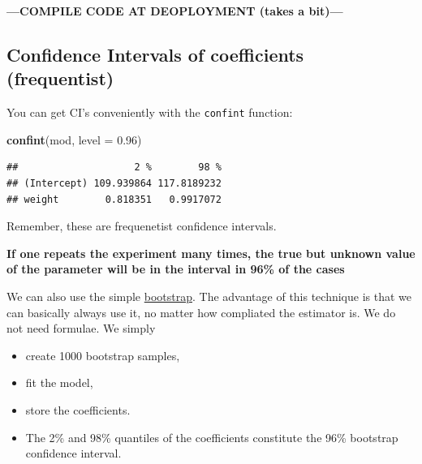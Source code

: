 \documentclass[
]{book}
\newenvironment{Shaded}{\begin{snugshade}}{\end{snugshade}}
\newcommand{\AttributeTok}[1]{\textcolor[rgb]{0.13,0.29,0.53}{#1}}
\newcommand{\FloatTok}[1]{\textcolor[rgb]{0.00,0.00,0.81}{#1}}
\newcommand{\FunctionTok}[1]{\textcolor[rgb]{0.13,0.29,0.53}{\textbf{#1}}}
\newcommand{\NormalTok}[1]{#1}
\providecommand{\tightlist}{%
  \setlength{\itemsep}{0pt}\setlength{\parskip}{0pt}}
\begin{document}
\textbf{---COMPILE CODE AT DEOPLOYMENT (takes a bit)---}

\subsection{Confidence Intervals of coefficients (frequentist)}\label{confidence_intervals_frequentist}

You can get CI's conveniently with the \texttt{confint} function:

\begin{Shaded}
\begin{Highlighting}[]
\FunctionTok{confint}\NormalTok{(mod, }\AttributeTok{level =} \FloatTok{0.96}\NormalTok{)}
\end{Highlighting}
\end{Shaded}

\begin{verbatim}
##                    2 %        98 %
## (Intercept) 109.939864 117.8189232
## weight        0.818351   0.9917072
\end{verbatim}

Remember, these are frequenetist confidence intervals.

\textbf{If one repeats the experiment
many times, the true but unknown value of the parameter will
be in the interval in 96\% of the cases}

We can also use the simple \href{https://en.wikipedia.org/wiki/Bootstrapping_(statistics)}{bootstrap}.
The advantage of this technique is that we can basically always use it,
no matter how compliated the estimator is. We do not need formulae.
We simply

\begin{itemize}
\tightlist
\item
  create 1000 bootstrap samples,
\item
  fit the model,
\item
  store the coefficients.
\item
  The 2\% and 98\% quantiles of the coefficients constitute the 96\% bootstrap confidence interval.
\end{itemize}
\end{document}
